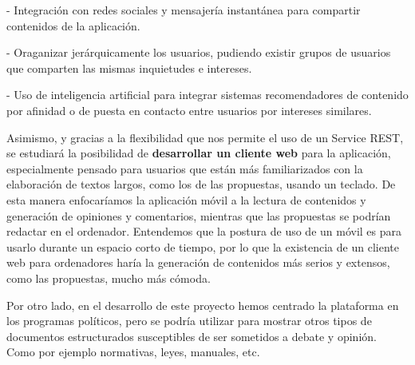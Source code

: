 - Integración con redes sociales y mensajería instantánea para compartir contenidos de la aplicación.

- Oraganizar jerárquicamente los usuarios, pudiendo existir grupos de usuarios que comparten las mismas inquietudes e intereses.

- Uso de inteligencia artificial para integrar sistemas recomendadores de contenido por afinidad o de puesta en contacto entre usuarios por intereses similares.
 
Asimismo, y gracias a la flexibilidad que nos permite el uso de un Service REST, se estudiará la posibilidad de \textbf{desarrollar un cliente web} para la aplicación, especialmente pensado para usuarios que están más familiarizados con la elaboración de textos largos, como los de las propuestas, usando un teclado. De esta manera enfocaríamos la aplicación móvil a la lectura de contenidos y generación de opiniones y comentarios, mientras que las propuestas se podrían redactar en el ordenador. Entendemos que la postura de uso de un móvil es para usarlo durante un espacio corto de tiempo, por lo que la existencia de un cliente web para ordenadores haría la generación de contenidos más serios y extensos, como las propuestas, mucho más cómoda.

Por otro lado, en el desarrollo de este proyecto hemos centrado la plataforma en los programas políticos, pero se podría utilizar para mostrar otros tipos de documentos estructurados susceptibles de ser sometidos a debate y opinión. Como por ejemplo normativas, leyes, manuales, etc.






